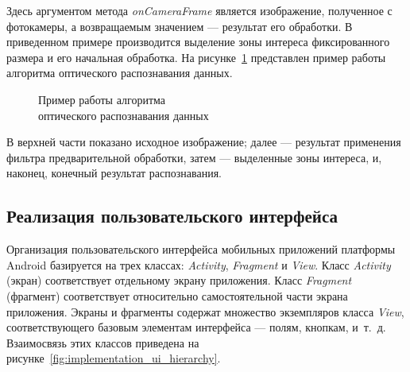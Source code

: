 Здесь аргументом метода \textit{onCameraFrame} является
изображение, полученное с фотокамеры, а возвращаемым значением ---
результат его обработки. В приведенном примере производится выделение
зоны интереса фиксированного размера и его начальная обработка.
На рисунке~\ref{fig:implementation_cv_recognition} представлен
пример работы алгоритма оптического распознавания данных.

\begin{figure}[h!]
  \centering
  \caption{Пример работы алгоритма \\ оптического распознавания данных}
  \label{fig:implementation_cv_recognition}
\end{figure}

В верхней части показано исходное изображение;
далее --- результат применения фильтра предварительной обработки,
затем --- выделенные зоны интереса, и, наконец, конечный результат распознавания.


\subsection{Реализация пользовательского интерфейса}
\label{subsec:implementation_ui}

Организация пользовательского интерфейса мобильных приложений
платформы Android базируется на трех классах:
\textit{Activity}, \textit{Fragment} и \textit{View}.
Класс \textit{Activity} (экран) соответствует отдельному экрану приложения.
Класс \textit{Fragment} (фрагмент) соответствует относительно самостоятельной части
экрана приложения.
Экраны и фрагменты содержат множество экземпляров класса \textit{View},
соответствующего базовым элементам интерфейса --- полям, кнопкам, и~т.~д.
Взаимосвязь этих классов приведена на рисунке~\ref{fig:implementation_ui_hierarchy}.

